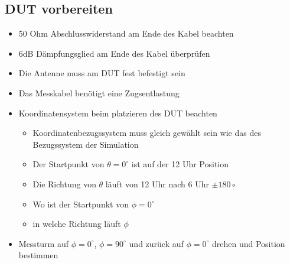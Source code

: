 	\subsection{DUT vorbereiten}
	\begin{itemize}
	\item 50 Ohm Abschlusswiderstand am Ende des Kabel beachten
	\item 6dB Dämpfungsglied am Ende des Kabel überprüfen
	\item Die Antenne muss am DUT fest befestigt sein
	\item Das Messkabel benötigt eine Zugsentlastung
	\item Koordinatensystem beim platzieren des DUT beachten
	\begin{itemize}
	\item Koordinatenbezugssystem muss gleich gewählt sein wie das des Bezugssystem der Simulation
	\item Der Startpunkt von $\theta=0^\circ$ ist auf der 12 Uhr Position
	\item Die Richtung von $\theta$ läuft von 12 Uhr nach 6 Uhr $\pm 180\circ$
	\item Wo ist der Startpunkt von $\phi=0^\circ$
	\item in welche Richtung läuft $\phi$
	\end{itemize}

	\item Messturm auf $\phi=0^\circ$, $\phi=90^\circ$ und zurück auf $\phi=0^\circ$ drehen und Position bestimmen
	\end{itemize}
